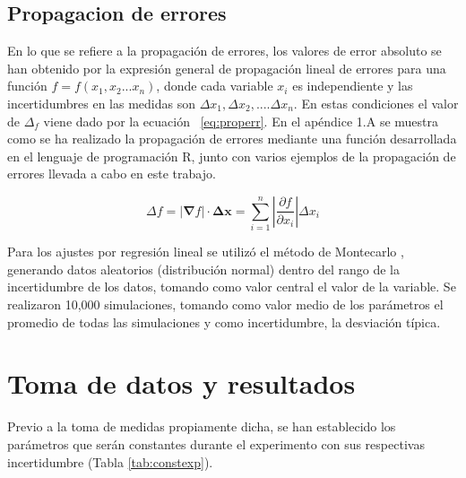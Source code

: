 	\subsection{Propagacion de errores}
	

	En lo que se refiere a la propagación de errores, los valores de error absoluto se han obtenido por la expresión general de propagación lineal de errores para una función $f=f(x_1,x_2...x_n)$, donde cada variable $x_i$  es independiente y las incertidumbres en las medidas son $\Delta x_1, \Delta x_2,....\Delta x_n$. En estas condiciones el valor de $\Delta_f$ viene dado por la ecuación ~\ref{eq:properr}. En el apéndice 1.A se muestra como se ha realizado la propagación de errores mediante una función desarrollada en el lenguaje de programación R, junto con varios ejemplos de la propagación de errores llevada a cabo en este trabajo.
	
	\vspace{\baselineskip}
	\begin{equation}\label{eq:properr}
		{\Delta f} = \left|\mathbf{\nabla}f\right|\cdot\mathbf{\Delta x} =  \sum_{i=1}^{n}\left|\frac{\partial f}{\partial x_i}\right|\Delta x_i
	\end{equation}
	
	\vspace{\baselineskip}
	Para los ajustes por regresión lineal se utilizó el método de Montecarlo \cite{Anderson_montecarlo}, generando datos aleatorios (distribución normal) dentro del rango de la incertidumbre de los datos, tomando como valor central el valor de la  variable. Se realizaron 10,000 simulaciones, tomando como valor medio de los parámetros el promedio de todas las simulaciones y como incertidumbre, la desviación típica.


	\section{Toma de datos y resultados}
	
	Previo a la toma de medidas propiamente dicha, se han establecido los parámetros que serán constantes durante el experimento con sus respectivas incertidumbre (Tabla \ref{tab:constexp}).  
	
